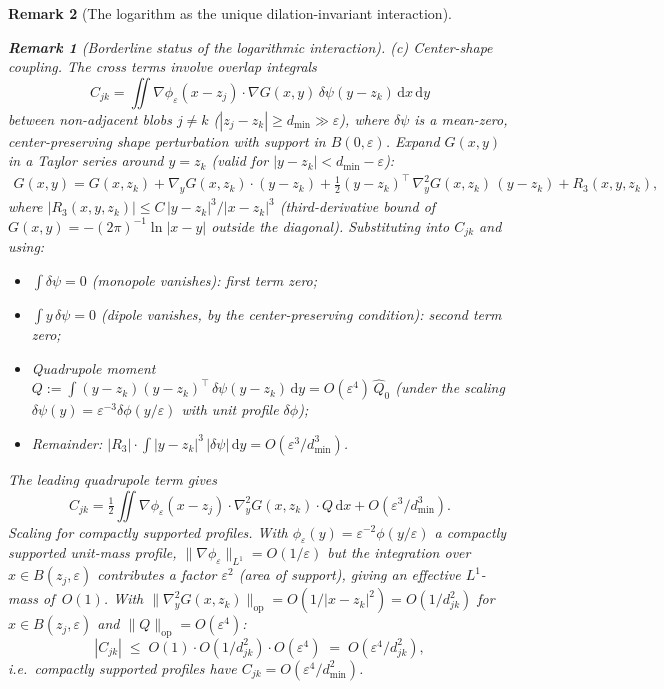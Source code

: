 \documentclass[12pt, a4paper]{article}
\newtheorem{remark}{Remark}[section]
\numberwithin{equation}{section}
\newcommand{\dd}{\mathrm{d}}
\begin{document}
\begin{remark}[The logarithm as the unique dilation-invariant interaction]
\begin{remark}[Borderline status of the logarithmic interaction]
\emph{(c) Center-shape coupling.}  The cross terms involve overlap
integrals
\[
  C_{jk} = \iint \nabla\phi_\varepsilon(x{-}z_j)\cdot
  \nabla G(x,y)\,\delta\psi(y{-}z_k)\,\dd x\,\dd y
\]
between non-adjacent blobs $j \ne k$ ($|z_j - z_k| \ge d_{\min}
\gg \varepsilon$), where $\delta\psi$ is a mean-zero,
center-preserving shape perturbation with support in
$B(0, \varepsilon)$.  Expand $G(x,y)$ in a Taylor series around
$y = z_k$ (valid for $|y - z_k| < d_{\min} - \varepsilon$):
\begin{align*}
  G(x,y) = G(x,z_k) + \nabla_y G(x,z_k)\cdot(y{-}z_k)
  + \tfrac{1}{2}(y{-}z_k)^\top\,\nabla_y^2 G(x,z_k)\,(y{-}z_k)
  + R_3(x,y,z_k),
\end{align*}
where $|R_3(x,y,z_k)| \le C\,|y{-}z_k|^3/|x{-}z_k|^3$
(third-derivative bound of $G(x,y) = -(2\pi)^{-1}\ln|x{-}y|$
outside the diagonal).
Substituting into $C_{jk}$ and using:
\begin{itemize}
  \item $\int\delta\psi = 0$ (monopole vanishes): first term zero;
  \item $\int y\,\delta\psi = 0$ (dipole vanishes, by the
    center-preserving condition): second term zero;
  \item Quadrupole moment
    $Q := \int(y{-}z_k)(y{-}z_k)^\top\,\delta\psi(y{-}z_k)\,\dd y
    = O(\varepsilon^4)\,\hat{Q}_0$
    (under the scaling $\delta\psi(y) = \varepsilon^{-3}
    \delta\phi(y/\varepsilon)$ with unit profile $\delta\phi$);
  \item Remainder:
    $|R_3|\cdot\int|y{-}z_k|^3\,|\delta\psi|\,\dd y
    = O(\varepsilon^3/d_{\min}^3)$.
\end{itemize}
The leading quadrupole term gives
\[
  C_{jk} = \tfrac{1}{2}\iint\nabla\phi_\varepsilon(x{-}z_j)\cdot
    \nabla_y^2 G(x, z_k)\cdot Q\,\dd x + O(\varepsilon^3/d_{\min}^3).
\]
\emph{Scaling for compactly supported profiles.}
With $\phi_\varepsilon(y) = \varepsilon^{-2}\phi(y/\varepsilon)$
a compactly supported unit-mass profile,
$\|\nabla\phi_\varepsilon\|_{L^1} = O(1/\varepsilon)$ but the
integration over $x \in B(z_j, \varepsilon)$ contributes a factor
$\varepsilon^2$ (area of support), giving an effective $L^1$-mass
of~$O(1)$.  With $\|\nabla_y^2 G(x, z_k)\|_{\mathrm{op}}
= O(1/|x{-}z_k|^2) = O(1/d_{jk}^2)$ for $x \in B(z_j,\varepsilon)$
and $\|Q\|_{\mathrm{op}} = O(\varepsilon^4)$:
\[
  |C_{jk}| \;\le\; O(1)\cdot O(1/d_{jk}^2)\cdot O(\varepsilon^4)
  \;=\; O(\varepsilon^4/d_{jk}^2),
\]
i.e.\ compactly supported profiles have $C_{jk} = O(\varepsilon^4/d_{\min}^2)$.


\end{remark}
\end{remark}
\end{document}
